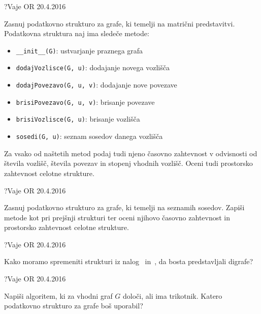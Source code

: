 
\begin{naloga}{?}{Vaje OR 20.4.2016}
\begin{vprasanje}[matgraf]
Zasnuj podatkovno strukturo za grafe,
ki temelji na matrični predstavitvi.
Podatkovna struktura naj ima sledeče metode:
\begin{itemize}
\item {\tt \_\_init\_\_(G)}: ustvarjanje praznega grafa
\item {\tt dodajVozlisce(G, u)}: dodajanje novega vozlišča
\item {\tt dodajPovezavo(G, u, v)}: dodajanje nove povezave
\item {\tt brisiPovezavo(G, u, v)}: brisanje povezave
\item {\tt brisiVozlisce(G, u)}: brisanje vozlišča
\item {\tt sosedi(G, u)}: seznam sosedov danega vozlišča
\end{itemize}
Za vsako od naštetih metod podaj tudi njeno časovno zahtevnost
v odvisnosti od števila vozlišč, števila povezav in stopenj vhodnih vozlišč.
Oceni tudi prostorsko zahtevnost celotne strukture.
\end{vprasanje}
\begin{odgovor}
\end{odgovor}
\end{naloga}


\begin{naloga}{?}{Vaje OR 20.4.2016}
\begin{vprasanje}[sosgraf]
Zasnuj podatkovno strukturo za grafe,
ki temelji na seznamih sosedov.
Zapiši metode kot pri prejšnji strukturi
ter oceni njihovo časovno zahtevnost
in prostorsko zahtevnost celotne strukture.
\end{vprasanje}
\begin{odgovor}
\end{odgovor}
\end{naloga}


\begin{naloga}{?}{Vaje OR 20.4.2016}
\begin{vprasanje}
Kako moramo spremeniti strukturi
iz nalog~ in~,
da bosta predstavljali digrafe?
\end{vprasanje}
\begin{odgovor}
\end{odgovor}
\end{naloga}


\begin{naloga}{?}{Vaje OR 20.4.2016}
\begin{vprasanje}
Napiši algoritem, ki za vhodni graf $G$ določi, ali ima trikotnik.
Katero podatkovno strukturo za grafe boš uporabil?
\end{vprasanje}
\begin{odgovor}
\end{odgovor}
\end{naloga}


